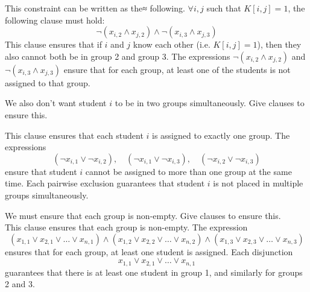 \documentclass[11pt,fleqn]{exam}
\newif\ifsolutions\solutionsfalse
\newenvironment{soln}{\color{solnblue}}{}
\begin{document}
\begin{questions}
\begin{soln}
  This constraint can be written as the≈ following. $\forall i, j$ such that $K[i,j] = 1$, the following clause must hold:
    \[
             \neg(x_{i,2}\wedge x_{j,2}) \wedge \neg(x_{i,3}\wedge x_{j,3})
    \]
  This clause ensures that if $i$ and $j$ know each other (i.e. $K[i,j]=1$), then they also cannot both be in group 2 and group 3. The expressions $\neg(x_{i,2}\wedge x_{j,2})$ and $\neg(x_{i,3}\wedge x_{j,3})$ ensure that for each group, at least one of the students is not assigned to that group.

  
  \end{soln}
  \ifsolutions
    
  \fi

  \question[2]
  We also don't want student $i$ to be in two groups simultaneously. Give clauses
  to ensure this.
  \begin{soln}

  This clause ensures that each student $i$ is assigned to exactly one group. The expressions 
\[
(\neg x_{i,1} \lor \neg x_{i,2}), \quad (\neg x_{i,1} \lor \neg x_{i,3}), \quad (\neg x_{i,2} \lor \neg x_{i,3})
\]
ensure that student $i$ cannot be assigned to more than one group at the same time. Each pairwise exclusion guarantees that student $i$ is not placed in multiple groups simultaneously.



  \end{soln}
  \ifsolutions
    
  \fi

  \question[2]
  We must ensure that each group is non-empty. Give clauses to ensure this. \\
  \begin{soln}
This clause ensures that each group is non-empty. The expression 
\[
(x_{1,1} \lor x_{2,1} \lor \dots \lor x_{n,1}) \land (x_{1,2} \lor x_{2,2} \lor \dots \lor x_{n,2}) \land (x_{1,3} \lor x_{2,3} \lor \dots \lor x_{n,3})
\]
ensures that for each group, at least one student is assigned. Each disjunction 
\[
x_{1,1} \lor x_{2,1} \lor \dots \lor x_{n,1}
\]
guarantees that there is at least one student in group 1, and similarly for groups 2 and 3.

  \end{soln}
  \ifsolutions
    
  \fi


\end{questions}
\end{document}
